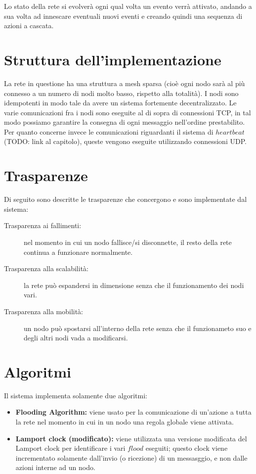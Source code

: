 \documentclass{memoir}
\begin{document}
Lo stato della rete si evolverà ogni qual volta un evento verrà attivato, andando
	   a sua volta ad innescare eventuali nuovi eventi e creando quindi una sequenza
	   di
	   azioni a cascata.

\section{Struttura dell'implementazione}

La rete in questione ha una struttura a mesh sparsa (cioè ogni nodo sarà al più
	   connesso a un numero di nodi molto basso, rispetto alla totalità).
I nodi sono idempotenti in modo tale da avere un sistema fortemente decentralizzato.
Le varie comunicazioni fra i nodi sono eseguite al di sopra di connessioni TCP, in
	   tal modo possiamo garantire la consegna di ogni messaggio nell'ordine prestabilito.
Per quanto concerne invece le comunicazioni riguardanti il sistema di $heartbeat$
	   (TODO: link al capitolo), queste vengono eseguite utilizzando connessioni UDP.

\section{Trasparenze}\label{Trasparenze}

Di seguito sono descritte le trasparenze che concergono e sono implementate dal sistema:

\begin{description} 
\item[Trasparenza ai fallimenti:] nel momento in cui un nodo fallisce/si disconnette,
	   il resto della rete continua a funzionare normalmente.
\item[Trasparenza alla scalabilità:] la rete può espandersi in dimensione senza
	   che il funzionamento dei nodi vari.
\item[Trasparenza alla mobilità:] un nodo può spostarsi all'interno della rete
	   senza che il funzionameto suo e degli altri nodi vada a modificarsi.
\end{description}

\section{Algoritmi}

Il sistema implementa solamente due algoritmi:
\begin{itemize}
\item \textbf{Flooding Algorithm:} viene usato per la comunicazione di un'azione
	   a tutta la rete nel momento in cui in un nodo una regola globale viene attivata.
\item \textbf{Lamport clock (modificato):} viene utilizzata una versione modificata
	   del Lamport clock per identificare i vari $flood$ eseguiti; questo clock viene
	   incrementato
	   solamente dall'invio (o ricezione) di un messasggio, e non dalle azioni interne
	   ad
	   un nodo.
\end{itemize}
\end{document}
